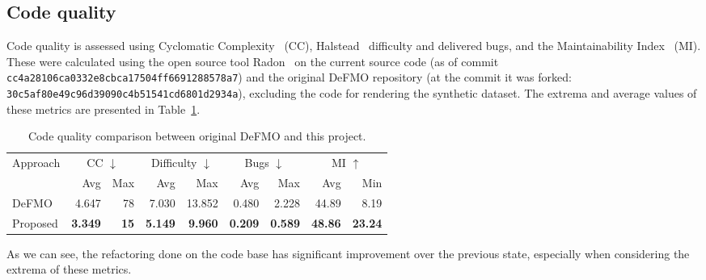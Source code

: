 \subsection{Code quality}
    Code quality is assessed using Cyclomatic Complexity~\citep{mccabe} (CC), Halstead~\citep{halstead} difficulty and delivered bugs, and the Maintainability Index~\citep{mi-original,mi-revision} (MI).
    These were calculated using the open source tool Radon~\citep{radon} on the current source code (as of commit \texttt{cc4a28106ca0332e8cbca17504ff6691288578a7}) and the original DeFMO repository (at the commit it was forked: \texttt{30c5af80e49c96d39090c4b51541cd6801d2934a}), excluding the code for rendering the synthetic dataset.
    The extrema and average values of these metrics are presented in Table~\ref{tab:radon}.

    \begin{table}
        \caption{Code quality comparison between original DeFMO and this project.}%
        \label{tab:radon}
        \centering
        \begin{tabular}{lrrrrrrrr}
            \toprule
            \multirow{2}[2]{*}{Approach} & \multicolumn{2}{c}{CC $\downarrow$} & \multicolumn{2}{c}{Difficulty $\downarrow$} & \multicolumn{2}{c}{Bugs $\downarrow$} & \multicolumn{2}{c}{MI $\uparrow$}\\
            \cmidrule(lr){2-3} \cmidrule(lr){4-5} \cmidrule(lr){6-7} \cmidrule(lr){8-9}
            & Avg & Max & Avg & Max & Avg & Max & Avg & Min\\
            \midrule
            DeFMO & 4.647 & 78 & 7.030 & 13.852 & 0.480 & 2.228 & 44.89 & 8.19\\
            Proposed & \textbf{3.349} & \textbf{15} & \textbf{5.149} & \textbf{9.960} & \textbf{0.209} & \textbf{0.589} & \textbf{48.86} & \textbf{23.24}\\
            \bottomrule
        \end{tabular}
    \end{table}

    As we can see, the refactoring done on the code base has significant improvement over the previous state, especially when considering the extrema of these metrics.
